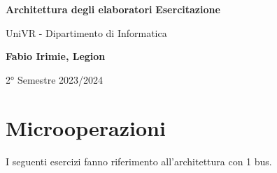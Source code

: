\documentclass[a4paper]{article}
\theoremstyle{break}
\theoremstyle{break}
\theoremstyle{break}
\theoremstyle{break}
\begin{document}
\begin{center}
  \vspace*{1cm}

  \Huge
  \textbf{Architettura degli elaboratori}
  \LARGE
  \textbf{Esercitazione}

  \vspace{0.5cm}
  \LARGE
  UniVR - Dipartimento di Informatica

  \vspace{1.5cm}

  \textbf{Fabio Irimie, Legion}

  \vfill


  \vspace{0.8cm}


  2° Semestre 2023/2024

\end{center}

\pagebreak
\tableofcontents
\pagebreak

\section{Microoperazioni}
I seguenti esercizi fanno riferimento all'architettura con 1 bus.
\end{document}
